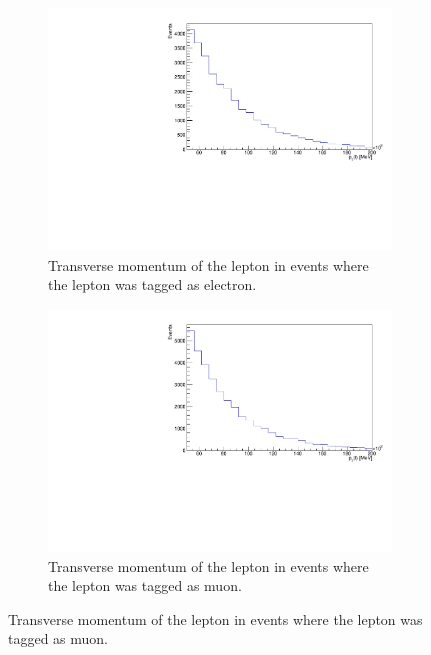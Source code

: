 \begin{figure}[H]%
  \begin{subfigure}{0.48\textwidth}%
    \centering%
    \includegraphics[width=\textwidth]{plots/ttbar_distributions/ttbar.el_lep_pt.pdf}%
    \caption{Transverse momentum of the lepton in events where the lepton was tagged as electron.}%
    \label{fig:2a}%
  \end{subfigure}%
  \hfill
  \begin{subfigure}{0.48\textwidth}%
    \centering%
    \includegraphics[width=\textwidth]{plots/ttbar_distributions/ttbar.mu_lep_pt.pdf}%
    \caption{Transverse momentum of the lepton in events where the lepton was tagged as muon.}%
    \label{fig:2b}%
  \end{subfigure}%


\end{figure}
